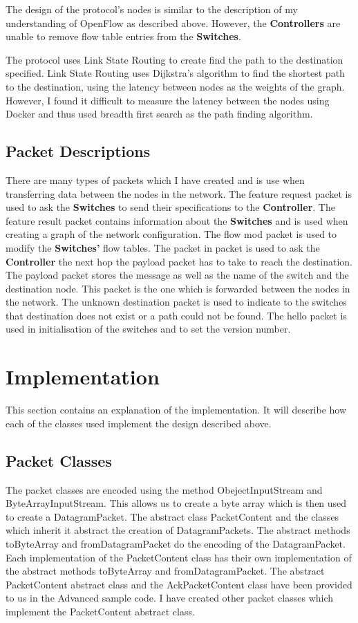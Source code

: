 \documentclass{article}
\begin{document}
The design of the protocol's nodes is similar to the description of my
understanding of OpenFlow as described above. However, the \textbf{Controllers}
are unable to remove flow table entries from the \textbf{Switches}.

The protocol uses Link State Routing to create find the path to the destination
specified. Link State Routing uses Dijkstra's algorithm to find the shortest
path to the destination, using the latency between nodes as the weights of the
graph. However, I found it difficult to measure the latency between the nodes
using Docker and thus used breadth first search as the path finding algorithm.

\subsection{Packet Descriptions}
There are many types of packets which I have created and is use when
transferring data between the nodes in the network. The feature request packet
is used to ask the \textbf{Switches} to send their specifications to the
\textbf{Controller}. The feature result packet contains information about the
\textbf{Switches} and is used when creating a graph of the network
configuration. The flow mod packet is used to modify the \textbf{Switches'}
flow tables. The packet in packet is used to ask the \textbf{Controller} the
next hop the payload packet has to take to reach the destination. The payload
packet stores the message as well as the name of the switch and the destination
node. This packet is the one which is forwarded between the nodes in the
network. The unknown destination packet is used to indicate to the switches
that destination does not exist or a path could not be found. The hello packet
is used in initialisation of the switches and to set the version number.

\section{Implementation}
This section contains an explanation of the implementation. It will describe how
each of the classes used implement the design described above.

\subsection{Packet Classes}
The packet classes are encoded using the method ObejectInputStream and
ByteArrayInputStream. This allows us to create a byte array which is then used
to create a DatagramPacket. The abstract class PacketContent and the classes
which inherit it abstract the creation of DatagramPackets. The abstract
methods toByteArray and fromDatagramPacket do the encoding of the
DatagramPacket. Each implementation of the PacketContent class has their own
implementation of the abstract methods toByteArray and fromDatagramPacket. The
abstract PacketContent abstract class and the AckPacketContent class have been
provided to us in the Advanced sample code. I have created other packet classes
which implement the PacketContent abstract class.
\end{document}
